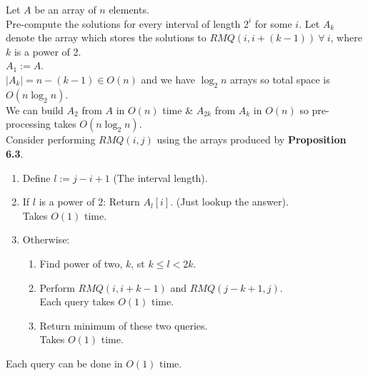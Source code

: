 \documentclass[11pt,a4paper]{article}
\begin{document}

Let $A$ be an array of $n$ elements.\\
Pre-compute the solutions for every interval of length $2^i$ for some $i$.
Let $A_k$ denote the array which stores the solutions to $RMQ(i,i+(k-1))\ \forall\ i$, where $k$ is a power of 2.\\
\nb $A_1:=A$.\\
$|A_k|=n-(k-1)\in O(n)$ and we have $\log_2n$ arrays so total space is $O(n\log_2n)$.\\
We can build $A_2$ from $A$ in $O(n)$ time \& $A_{2k}$ from $A_k$ in $O(n)$ so pre-processing takes $O(n\log_2n)$.\\

Consider performing $RMQ(i,j)$ using the arrays produced by \textbf{Proposition 6.3}.
\begin{enumerate}
	\item Define $l:=j-i+1$ (The interval length).
	\item If $l$ is a power of $2$: Return $A_{l}[i]$. (\ie Just lookup the answer).\\
	\nb Takes $O(1)$ time.
	\item Otherwise:
	\begin{enumerate}
		\item Find power of two, $k$, st $k\leq l<2k$.
		\item Perform $RMQ(i,i+k-1)$ and $RMQ(j-k+1,j)$.\\
		\nb Each query takes $O(1)$ time.
		\item Return minimum of these two queries.\\
		\nb Takes $O(1)$ time.
	\end{enumerate}
\end{enumerate}
Each query can be done in $O(1)$ time.\\

\end{document}
